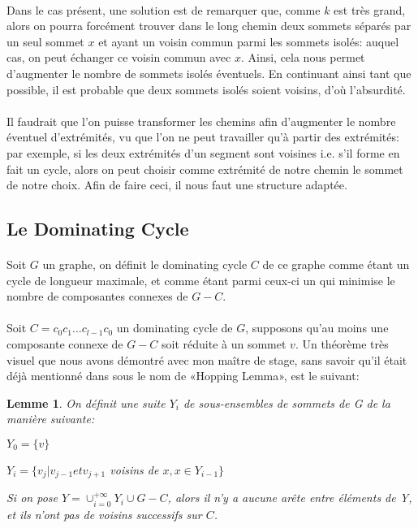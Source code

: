 \documentclass[a4paper]{article}
\newtheorem{lemma}[theorem]{Lemme}
\theoremstyle{definition}
\theoremstyle{remark}
\begin{document}
\paragraph{}
Dans le cas présent, une solution est de remarquer que, comme $k$ est 
très grand, alors on pourra forcément trouver dans le long chemin deux 
sommets séparés par un seul sommet $x$ et ayant un voisin commun parmi les sommets isolés: auquel cas, on peut échanger ce voisin commun avec $x$. Ainsi, cela nous permet d'augmenter le nombre de sommets isolés 
éventuels. En continuant ainsi tant que possible, il est probable que 
deux sommets isolés soient voisins, d'où l'absurdité.

\paragraph{}
Il faudrait que l'on puisse transformer les chemins afin d'augmenter le
nombre éventuel d'extrémités, vu que l'on ne peut travailler qu'à partir
des extrémités: par exemple, si les deux extrémités d'un segment sont
voisines i.e. s'il forme en fait un cycle, alors on peut choisir comme
extrémité de notre chemin le sommet de notre choix. Afin de faire ceci,
il nous faut une structure adaptée.

\subsection{Le Dominating Cycle}

\paragraph{}
Soit $G$ un graphe, on définit le dominating cycle $C$ de ce graphe comme étant un 
cycle de longueur maximale, et comme étant parmi ceux-ci un qui minimise 
le nombre de composantes connexes de $G - C$.

\paragraph{}
Soit $C = c_{0} c_{1} ... c_{l-1} c_{0}$ un dominating cycle de $G$,
supposons qu'au moins une composante connexe de $G - C$ soit réduite à un
sommet $v$. Un théorème très visuel que nous avons démontré avec mon 
maître de stage, sans savoir qu'il était déjà mentionné dans \cite{Woodall} sous le nom de «Hopping Lemma», est le suivant:

\begin{lemma}
On définit une suite $Y_{i}$ de sous-ensembles de sommets de G de la manière suivante:

$Y_{0}= \{v \}$

$Y_{i} = \{v_{j} | v_{j-1} et v_{j+1}$ voisins de $x, x \in Y_{i-1}\}$


Si on pose $Y = \cup_{i=0}^{+ \infty} Y_{i} \cup G-C$, alors il n'y a aucune arête entre éléments de Y, et ils n'ont pas de voisins successifs sur $C$.
\end{lemma}
\end{document}
